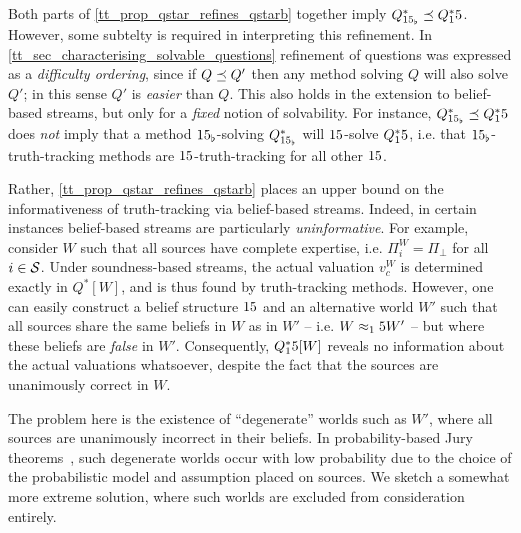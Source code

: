 Both parts of \cref{tt_prop_qstar_refines_qstarb} together imply
$Q^*_{15_\flat} \preceq Q^*_15$. However, some subtelty is required in
interpreting this refinement. In
\cref{tt_sec_characterising_solvable_questions} refinement of questions was
expressed as a \emph{difficulty ordering}, since if $Q \preceq Q'$ then any
method solving $Q$ will also solve $Q'$; in this sense $Q'$ is \emph{easier}
than $Q$. This also holds in the extension to belief-based streams, but only
for a \emph{fixed} notion of solvability. For instance, $Q^*_{15_\flat}
\preceq Q^*_15$ does \emph{not} imply that a method $15_\flat$-solving
$Q^*_{15_\flat}$ will $15$-solve $Q^*_15$, i.e. that $15_\flat$-truth-tracking
methods are $15$-truth-tracking for all other $15$.\footnotemark{}


Rather, \cref{tt_prop_qstar_refines_qstarb} places an upper bound on the
informativeness of truth-tracking via belief-based streams. Indeed, in certain
instances belief-based streams are particularly \emph{uninformative}. For
example, consider $W$ such that all sources have complete expertise, i.e.
$\Pi^W_i = \Pi_\bot$ for all $i \in \mathcal{S}$. Under soundness-based streams, the
actual valuation $v^W_c$ is determined exactly in $Q^*[W]$, and is thus found
by truth-tracking methods. However, one can easily construct a belief structure
$15$ and an alternative world $W'$ such that all sources share the same beliefs
in $W$ as in $W'$ -- i.e. $W \approx_15 W'$ -- but where these beliefs are
\emph{false} in $W'$. Consequently, $Q^*_15[W]$ reveals no information about
the actual valuations whatsoever, despite the fact that the sources are
unanimously correct in $W$.

The problem here is the existence of ``degenerate'' worlds such as $W'$, where
all sources are unanimously incorrect in their beliefs. In probability-based
Jury theorems~\cite{grofman1983thirteen}, such degenerate worlds occur with low
probability due to the choice of the probabilistic model and assumption placed
on sources. We sketch a somewhat more extreme solution, where such
worlds are excluded from consideration entirely.

